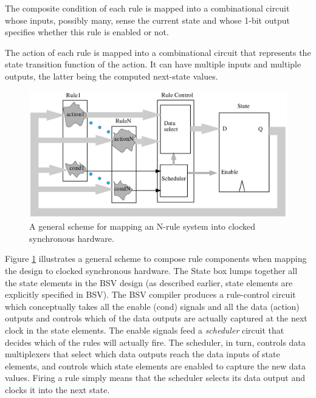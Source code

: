 \documentclass[twoside,letterpaper]{article}
\newcommand{\BSV}{BSV}
\begin{document}
The composite condition of each rule is mapped into a combinational
circuit whose inputs, possibly many, sense the current state and whose
1-bit output specifies whether this rule is enabled or not.

The action of each rule is mapped into a combinational circuit that
represents the state transition function of the action.  It can have
multiple inputs and multiple outputs, the latter being the computed
next-state values.

\begin{figure}[htbp]
    \centerline{\includegraphics[width=\textwidth]{Figures/fig_MappingToHW.png}}
    \caption{%
        \label{fig_MappingToHW}
        A general scheme for mapping an N-rule system into clocked
        synchronous hardware.
    }
\end{figure}
Figure \ref{fig_MappingToHW} illustrates a general scheme to compose
rule components when mapping the design to clocked synchronous
hardware.  The State box lumps together all the state elements in the
{\BSV} design (as described earlier, state elements are explicitly
specified in {\BSV}).  The {\BSV} compiler produces a rule-control
circuit which conceptually takes all the enable (cond) signals and all
the data (action) outputs and controls which of the data outputs are
actually captured at the next clock in the state elements.  The enable
signals feed a \emph{scheduler} circuit that decides which of the
rules will actually fire.  The scheduler, in turn, controls data
multiplexers that select which data outputs reach the data inputs of
state elements, and controls which state elements are enabled to
capture the new data values.  Firing a rule simply means that the
scheduler selects its data output and clocks it into the next state.
\end{document}
